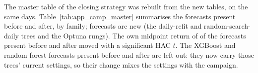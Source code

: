 %
The master table of the closing strategy was rebuilt from the new tables, on the same
\campMTHeadDays{} days. Table~\ref{tab:app_camp_master} summarises the
\campMTKeysBoth{} forecasts present before and after, by family; \campMTKeysNew{} forecasts
are new (the daily-refit and random-search-daily trees and the Optuna rungs). The own midpoint return of \campMTSigHacN{} of the forecasts present before and after
moved with a significant HAC $t$.
The \campMTSwitchedN{} XGBoost and random-forest forecasts present before and after are left
out: they now carry those trees' current settings, so their change mixes the settings with
the campaign.

